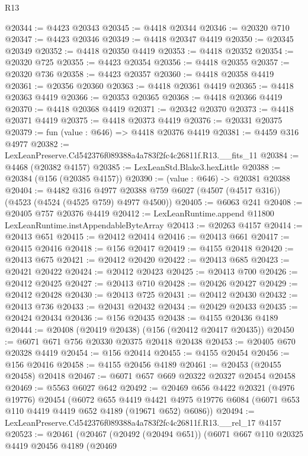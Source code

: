\begin{lexlean}{R13}
\begin{coremodule}
@20344 := @4423 @20343
@20345 := @4418 @20344
@20346 := @20320 @710
@20347 := @4423 @20346
@20349 := @4418 @20347 @4419
@20350 := @20345 @20349
@20352 := @4418 @20350 @4419
@20353 := @4418 @20352
@20354 := @20320 @725
@20355 := @4423 @20354
@20356 := @4418 @20355
@20357 := @20320 @736
@20358 := @4423 @20357
@20360 := @4418 @20358 @4419
@20361 := @20356 @20360
@20363 := @4418 @20361 @4419
@20365 := @4418 @20363 @4419
@20366 := @20353 @20365
@20368 := @4418 @20366 @4419
@20370 := @4418 @20368 @4419
@20371 := @20342 @20370
@20373 := @4418 @20371 @4419
@20375 := @4418 @20373 @4419
@20376 := @20331 @20375
@20379 := fun (value : @646) => @4418 @20376 @4419
@20381 := @4459 @316 @4977
@20382 := LexLeanPreserve.Cd542376f089388a4a783f2fc4c26811f.R13.__fits_11
@20384 := @4468 (@20382 @4157)
@20385 := LexLeanStd.Blake3.hexLittle
@20388 := @20384 (@156 (@20385 @4157))
@20390 := (value : @646) -> @20381 @20388
@20404 := @4482
    @316
    @4977
    @20388
    @759
    @6027
    (@4507 (@4517 @316))
    (@4523 (@4524 (@4525 @759) @4977 @4500))
@20405 := @6063 @241
@20408 := @20405 @757 @20376 @4419
@20412 := LexLeanRuntime.append @11800 LexLeanRuntime.instAppendableByteArray
@20413 := @20263 @4157
@20414 := @20413 @651
@20415 := @20412 @20414
@20416 := @20413 @661
@20417 := @20415 @20416
@20418 := @156 @20417
@20419 := @4155 @20418
@20420 := @20413 @675
@20421 := @20412 @20420
@20422 := @20413 @685
@20423 := @20421 @20422
@20424 := @20412 @20423
@20425 := @20413 @700
@20426 := @20412 @20425
@20427 := @20413 @710
@20428 := @20426 @20427
@20429 := @20412 @20428
@20430 := @20413 @725
@20431 := @20412 @20430
@20432 := @20413 @736
@20433 := @20431 @20432
@20434 := @20429 @20433
@20435 := @20424 @20434
@20436 := @156 @20435
@20438 := @4155 @20436 @4189
@20444 := @20408 (@20419 @20438) (@156 (@20412 @20417 @20435))
@20450 := @6071 @671 @756 @20330 @20375 @20418 @20438
@20453 := @20405 @670 @20328 @4419
@20454 := @156 @20414
@20455 := @4155 @20454
@20456 := @156 @20416
@20458 := @4155 @20456 @4189
@20461 := @20453 (@20455 @20458) @20418
@20467 := @6071 @657 @669 @20322 @20327 @20454 @20458
@20469 := @5563 @6027 @642
@20492 := @20469
    @656
    @4422
    @20321
    (@4976 @19776)
    @20454
    (@6072
      @655
      @4419
      @4421
      @4975
      @19776
      @6084
      (@6071 @653 @110 @4419 @4419 @652 @4189 (@19671 @652) @6086))
@20494 := LexLeanPreserve.Cd542376f089388a4a783f2fc4c26811f.R13.__rel_17 @4157
@20523 := @20461
    (@20467
      (@20492 (@20494 @651))
      (@6071
        @667
        @110
        @20325
        @4419
        @20456
        @4189
        (@20469

\end{coremodule}
\end{lexlean}
